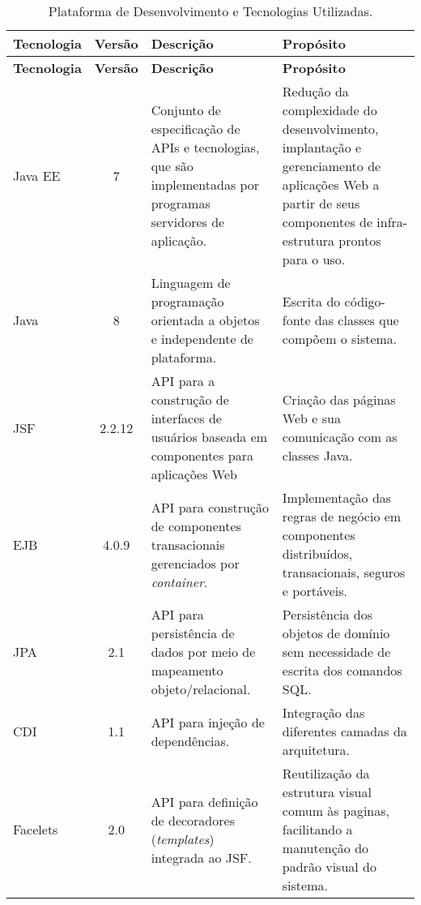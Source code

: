 \begin{footnotesize}
\begin{longtable}{|p{1.8cm}|c|p{5cm}|p{6.3cm}|}
	\caption{Plataforma de Desenvolvimento e Tecnologias Utilizadas.}	
	\label{tabela-plataforma}\\\hline

	\rowcolor{lightgray}
	\textbf{Tecnologia} & \textbf{Versão} & \textbf{Descrição} & \textbf{Propósito} \\\hline 
	\endfirsthead
	\hline
	\rowcolor{lightgray}
	\textbf{Tecnologia} & \textbf{Versão} & \textbf{Descrição} & \textbf{Propósito} \\\hline 
	\endhead
		
	Java EE & 7 & Conjunto de especificação de APIs e tecnologias, que são implementadas por programas servidores de aplicação. & Redução da complexidade do desenvolvimento, implantação e gerenciamento de aplicações Web a partir de seus componentes de infra-estrutura prontos para o uso. \\ \hline

	Java & 8 & Linguagem de programação orientada a objetos e independente de plataforma. & Escrita do código-fonte das classes que compõem o sistema. \\\hline
	
	JSF & 2.2.12 & API para a construção de interfaces de usuários baseada em componentes para aplicações Web & Criação das páginas Web e sua comunicação com as classes Java.  \\\hline  
	
	EJB & 4.0.9 & API para construção de componentes transacionais gerenciados por \textit{container}. & Implementação das regras de negócio em componentes distribuídos, transacionais, seguros e portáveis. \\\hline
	
	JPA & 2.1 & API para persistência de dados por meio de mapeamento objeto/relacional. & Persistência dos objetos de domínio sem necessidade de escrita dos comandos SQL. \\\hline
	
	CDI & 1.1 & API para injeção de dependências. & Integração das diferentes camadas da arquitetura. \\\hline
	
	Facelets & 2.0 &  API para definição de decoradores (\textit{templates}) integrada ao JSF. & Reutilização da estrutura visual comum às paginas, facilitando a manutenção do padrão visual do sistema. \\\hline
	

\end{longtable}
\end{footnotesize}
